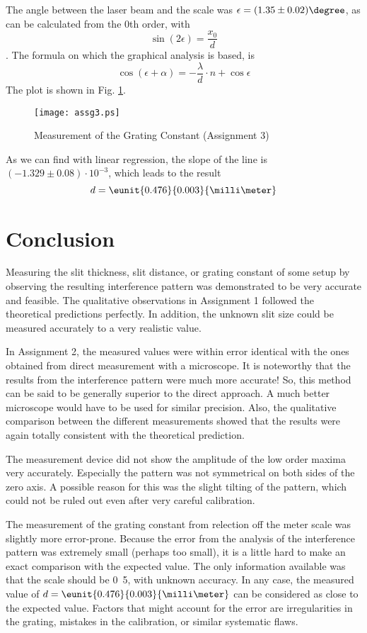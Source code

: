 \documentclass[a4paper,10pt]{article}
\begin{document}
The angle between the laser beam and the scale was $\epsilon = (1.35 \pm 0.02)\degree$, as can be calculated from the 0th order, with
\begin{equation}
\sin(2\epsilon) = \frac{x_0}{d}
\end{equation}.
The formula on which the graphical analysis is based, is
\begin{equation}
\cos(\epsilon + \alpha) = -\frac{\lambda}{d} \cdot n + \cos{\epsilon}
\end{equation}
The plot is shown in Fig. \ref{assg3}.
\begin{figure}[t]
    \centering
    \texttt{[image: assg3.ps]}
    \caption{Measurement of the Grating Constant (Assignment 3)}
    \label{assg3}
\end{figure}
As we can find with linear regression, the slope of the line is $(-1.329 \pm 0.08) \cdot 10^{-3}$, which leads to the result
\begin{equation*}
d = \eunit{0.476}{0.003}{\milli\meter}
\end{equation*}



\section{Conclusion}
Measuring the slit thickness, slit distance, or grating constant of some setup by observing the resulting interference pattern was demonstrated to be very accurate and feasible. The qualitative observations in Assignment 1 followed the theoretical predictions perfectly. In addition, the unknown slit size could be measured accurately to a very realistic value.

In Assignment 2, the measured values were within error identical with the ones obtained from direct measurement with a microscope. It is noteworthy that the results from the interference pattern were much more accurate! So, this method can be said to be generally superior to the direct approach. A much better microscope would have to be used for similar precision. Also, the qualitative comparison between the different measurements showed that the results were again totally consistent with the theoretical prediction.

The measurement device did not show the amplitude of the low order maxima very accurately. Especially the pattern was not symmetrical on both sides of the zero axis. A possible reason for this was the slight tilting of the pattern, which could not be ruled out even after very careful calibration.

The measurement of the grating constant from relection off the meter scale was slightly more error-prone. Because the error from the analysis of the interference pattern was extremely small (perhaps too small), it is a little hard to make an exact comparison with the expected value. The only information available was that the scale should be \unit{0.5}{\milli\meter}, with unknown accuracy. In any case, the measured value of $d = \eunit{0.476}{0.003}{\milli\meter}$ can be considered as close to the expected value. Factors that might account for the error are irregularities in the grating, mistakes in the calibration, or similar systematic flaws.
\end{document}
